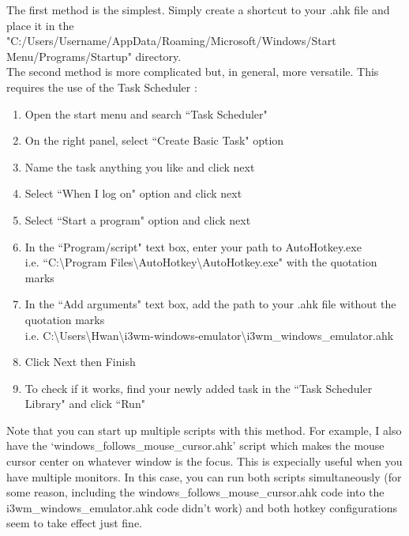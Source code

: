The first method is the simplest. Simply create a shortcut to your .ahk file
and place it in the\\
"C:/Users/Username/AppData/Roaming/Microsoft/Windows/Start
Menu/Programs/Startup" directory.\\

The second method is more complicated but, in general, more versatile. This
requires the use of the Task Scheduler \cite{bashkarla2016how}:
\begin{enumerate}
    \item Open the start menu and search ``Task Scheduler"
    \item On the right panel, select ``Create Basic Task" option
    \item Name the task anything you like and click next
    \item Select ``When I log on" option and click next
    \item Select ``Start a program" option and click next
    \item In the ``Program/script" text box, enter your path to AutoHotkey.exe\\
        i.e. ``C:\textbackslash Program Files\textbackslash AutoHotkey\textbackslash AutoHotkey.exe"
        with the quotation marks
    \item In the ``Add arguments" text box, add the path to your .ahk file
        without the quotation marks\\
        i.e. C:\textbackslash Users\textbackslash Hwan\textbackslash i3wm-windows-emulator\textbackslash i3wm\_windows\_emulator.ahk
    \item Click Next then Finish
    \item To check if it works, find your newly added task in the ``Task Scheduler Library" and
       click ``Run"
\end{enumerate}
Note that you can start up multiple scripts with this method. For example, I
also have the `windows\_follows\_mouse\_cursor.ahk' script which makes the mouse
cursor center on whatever window is the focus. This is expecially useful when
you have multiple monitors. In this case, you can run both scripts
simultaneously (for some reason, including the
windows\_follows\_mouse\_cursor.ahk code into the i3wm\_windows\_emulator.ahk
code didn't work) and both hotkey configurations seem to take effect just fine.
